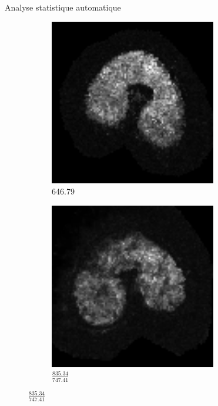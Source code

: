 \documentclass[10pt]{beamer}
\begin{document}
\begin{frame}{Analyse statistique automatique}
\begin{figure}
    \begin{subfigure}[c]{0.33\textwidth}
      \centering
      \includegraphics[width=0.8\textwidth]{fig/autocorr_msi_250_density}
      \caption{646.79}
      \label{subfig:autocorr_msi_250_density}
    \end{subfigure}%
    \begin{subfigure}[c]{0.33\textwidth}
      \centering
      \includegraphics[width=0.8\textwidth]{fig/autocorr_msi_650_density}
      \caption{$\frac{835.34}{747.41}$}
      \label{subfig:autocorr_msi_650_density}
    \end{subfigure}
  \end{figure}
  
\end{frame}
\end{document}

